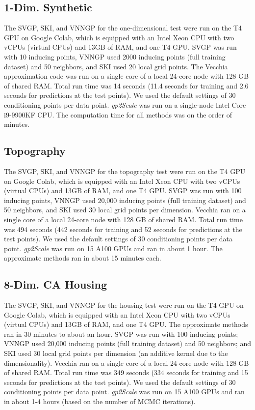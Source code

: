\documentclass{article}
\begin{document}
\subsection{1-Dim. Synthetic}
The SVGP, SKI, and VNNGP for the one-dimensional test were run on the T4 GPU on Google Colab, which is equipped with an Intel Xeon CPU with two vCPUs (virtual CPUs) and 13GB of RAM, and one T4 GPU. 
SVGP was run with 10 inducing points, VNNGP used 2000 inducing points (full training dataset) and 50 neighbors, and SKI used 20 local grid points. The Vecchia approximation code was run on a single core of a local 24-core node with 128 GB of shared RAM. Total run time was 14 seconds (11.4 seconds for training and 2.6 seconds for predictions at the test points). We used the default settings of 30 conditioning points per data point. \emph{gp2Scale} was run on a single-node Intel Core i9-9900KF CPU. 
The computation time for all methods was on the order of minutes.



\subsection{Topography}
The SVGP, SKI, and VNNGP for the topography test were run on the T4 GPU on Google Colab, which is equipped with an Intel Xeon CPU with two vCPUs (virtual CPUs) and 13GB of RAM, and one T4 GPU. 
SVGP was run with 100 inducing points, VNNGP used 20,000 inducing points (full training dataset) and 50 neighbors, and SKI used 30 local grid points per dimension.
Vecchia ran on a single core of a local 24-core node with 128 GB of shared RAM. Total run time was 494 seconds (442 seconds for training and 52 seconds for predictions at the test points). We used the default settings of 30 conditioning points per data point.
\emph{gp2Scale} was run on 15 A100 GPUs and ran in about 1 hour. 
The approximate methods ran in about 15 minutes each.


\subsection{8-Dim. CA Housing}
The SVGP, SKI, and VNNGP for the housing test were run on the T4 GPU on Google Colab, which is equipped with an Intel Xeon CPU with two vCPUs (virtual CPUs) and 13GB of RAM, and one T4 GPU. The approximate methods ran in 30 minutes to about an hour. 
SVGP was run with 100 inducing points; VNNGP used 20,000 inducing points (full training dataset) and 50 neighbors; and SKI used 30 local grid points per dimension (an additive kernel due to the dimensionality).
Vecchia ran on a single core of a local 24-core node with 128 GB of shared RAM. Total run time was 349 seconds (334 seconds for training and 15 seconds for predictions at the test points). We used the default settings of 30 conditioning points per data point.
\emph{gp2Scale} was run on 15 A100 GPUs and ran in about 1-4 hours (based on the number of MCMC iterations).
\end{document}
